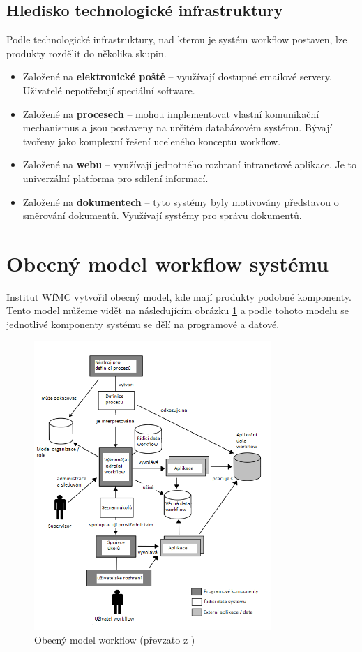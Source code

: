 \documentclass{fithesis}
\begin{document}
\subsection{Hledisko technologické infrastruktury}
Podle technologické infrastruktury, nad kterou je systém workflow postaven, lze produkty rozdělit do několika skupin.
\begin{itemize}
\item Založené na \textbf{elektronické poště} -- využívají dostupné emailové servery. Uživatelé nepotřebují speciální software.
\item Založené na \textbf{procesech} -- mohou implementovat vlastní komunikační mechanismus a jsou postaveny na určitém databázovém systému. Bývají tvořeny jako komplexní řešení uceleného konceptu workflow.
\item Založené na \textbf{webu} -- využívají jednotného rozhraní intranetové aplikace. Je to univerzální platforma pro sdílení informací.
\item Založené na \textbf{dokumentech} -- tyto systémy byly motivovány představou o směrování dokumentů. Využívají systémy pro správu dokumentů.
\end{itemize}

\section{Obecný model workflow systému}
Institut WfMC vytvořil obecný model, kde mají produkty podobné komponenty. Tento model můžeme vidět na následujícím obrázku \ref{fig:obecny_model_workflow} a podle tohoto modelu se  jednotlivé komponenty systému se dělí na programové a datové.

\begin{figure}[htp]
\centering
\includegraphics[width=340px]{images/obecny_model.png}

\caption{Obecný model workflow (převzato z \cite{wfmc})}
\label{fig:obecny_model_workflow}
\end{figure}
\clearpage
\end{document}
